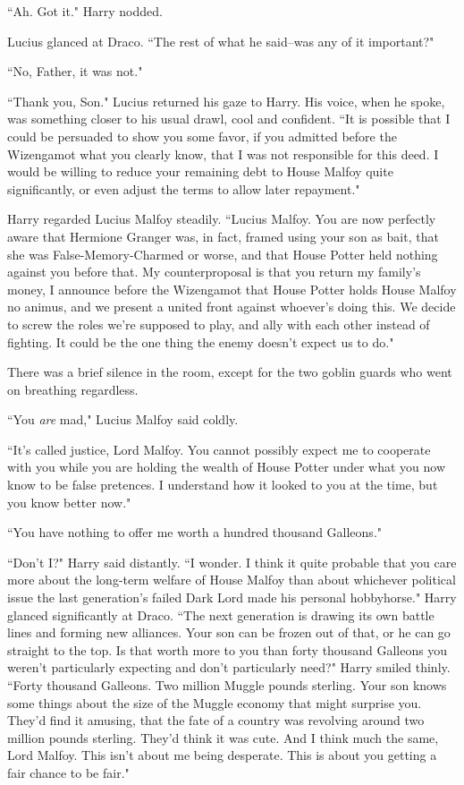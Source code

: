``Ah. Got it." Harry nodded.

Lucius glanced at Draco. ``The rest of what he said\---was any of it important?"

``No, Father, it was not."

``Thank you, Son." Lucius returned his gaze to Harry. His voice, when he spoke, was something closer to his usual drawl, cool and confident. ``It is possible that I could be persuaded to show you some favor, if you admitted before the Wizengamot what you clearly know, that I was not responsible for this deed. I would be willing to reduce your remaining debt to House Malfoy quite significantly, or even adjust the terms to allow later repayment."

Harry regarded Lucius Malfoy steadily. ``Lucius Malfoy. You are now perfectly aware that Hermione Granger was, in fact, framed using your son as bait, that she was False-Memory-Charmed or worse, and that House Potter held nothing against you before that. My counterproposal is that you return my family's money, I announce before the Wizengamot that House Potter holds House Malfoy no animus, and we present a united front against whoever's doing this. We decide to screw the roles we're supposed to play, and ally with each other instead of fighting. It could be the one thing the enemy doesn't expect us to do."

There was a brief silence in the room, except for the two goblin guards who went on breathing regardless.

``You \emph{are} mad," Lucius Malfoy said coldly.

``It's called justice, Lord Malfoy. You cannot possibly expect me to cooperate with you while you are holding the wealth of House Potter under what you now know to be false pretences. I understand how it looked to you at the time, but you know better now."

``You have nothing to offer me worth a hundred thousand Galleons."

``Don't I?" Harry said distantly. ``I wonder. I think it quite probable that you care more about the long-term welfare of House Malfoy than about whichever political issue the last generation's failed Dark Lord made his personal hobbyhorse." Harry glanced significantly at Draco. ``The next generation is drawing its own battle lines and forming new alliances. Your son can be frozen out of that, or he can go straight to the top. Is that worth more to you than forty thousand Galleons you weren't particularly expecting and don't particularly need?" Harry smiled thinly. ``Forty thousand Galleons. Two million Muggle pounds sterling. Your son knows some things about the size of the Muggle economy that might surprise you. They'd find it amusing, that the fate of a country was revolving around two million pounds sterling. They'd think it was cute. And I think much the same, Lord Malfoy. This isn't about me being desperate. This is about you getting a fair chance to be fair."

